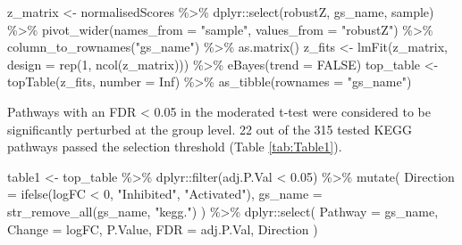 \documentclass[9pt,a4paper,]{extarticle}
\newenvironment{Shaded}{\begin{snugshade}}{\end{snugshade}}
\newcommand{\AttributeTok}[1]{\textcolor[rgb]{0.77,0.63,0.00}{#1}}
\newcommand{\ConstantTok}[1]{\textcolor[rgb]{0.00,0.00,0.00}{#1}}
\newcommand{\DecValTok}[1]{\textcolor[rgb]{0.00,0.00,0.81}{#1}}
\newcommand{\FloatTok}[1]{\textcolor[rgb]{0.00,0.00,0.81}{#1}}
\newcommand{\FunctionTok}[1]{\textcolor[rgb]{0.00,0.00,0.00}{#1}}
\newcommand{\NormalTok}[1]{#1}
\newcommand{\OtherTok}[1]{\textcolor[rgb]{0.56,0.35,0.01}{#1}}
\newcommand{\SpecialCharTok}[1]{\textcolor[rgb]{0.00,0.00,0.00}{#1}}
\newcommand{\StringTok}[1]{\textcolor[rgb]{0.31,0.60,0.02}{#1}}
\begin{document}
\begin{Shaded}
\begin{Highlighting}[]
\NormalTok{z\_matrix }\OtherTok{\textless{}{-}}\NormalTok{ normalisedScores }\SpecialCharTok{\%\textgreater{}\%}
\NormalTok{  dplyr}\SpecialCharTok{::}\FunctionTok{select}\NormalTok{(robustZ, gs\_name, sample) }\SpecialCharTok{\%\textgreater{}\%}
  \FunctionTok{pivot\_wider}\NormalTok{(}\AttributeTok{names\_from =} \StringTok{"sample"}\NormalTok{, }\AttributeTok{values\_from =} \StringTok{"robustZ"}\NormalTok{) }\SpecialCharTok{\%\textgreater{}\%}
  \FunctionTok{column\_to\_rownames}\NormalTok{(}\StringTok{"gs\_name"}\NormalTok{) }\SpecialCharTok{\%\textgreater{}\%}
  \FunctionTok{as.matrix}\NormalTok{()}
\NormalTok{z\_fits }\OtherTok{\textless{}{-}} \FunctionTok{lmFit}\NormalTok{(z\_matrix, }\AttributeTok{design =} \FunctionTok{rep}\NormalTok{(}\DecValTok{1}\NormalTok{, }\FunctionTok{ncol}\NormalTok{(z\_matrix))) }\SpecialCharTok{\%\textgreater{}\%} 
  \FunctionTok{eBayes}\NormalTok{(}\AttributeTok{trend =} \ConstantTok{FALSE}\NormalTok{)}
\NormalTok{top\_table }\OtherTok{\textless{}{-}} \FunctionTok{topTable}\NormalTok{(z\_fits, }\AttributeTok{number =} \ConstantTok{Inf}\NormalTok{) }\SpecialCharTok{\%\textgreater{}\%}
  \FunctionTok{as\_tibble}\NormalTok{(}\AttributeTok{rownames =} \StringTok{"gs\_name"}\NormalTok{)}
\end{Highlighting}
\end{Shaded}

Pathways with an FDR \textless{} 0.05 in the moderated t-test were considered to be significantly perturbed at the group level.
22 out of the 315 tested KEGG pathways passed the selection threshold (Table \ref{tab:Table1}).

\begin{Shaded}
\begin{Highlighting}[]
\NormalTok{table1 }\OtherTok{\textless{}{-}}\NormalTok{ top\_table }\SpecialCharTok{\%\textgreater{}\%}
\NormalTok{  dplyr}\SpecialCharTok{::}\FunctionTok{filter}\NormalTok{(adj.P.Val }\SpecialCharTok{\textless{}} \FloatTok{0.05}\NormalTok{) }\SpecialCharTok{\%\textgreater{}\%} 
  \FunctionTok{mutate}\NormalTok{(}
    \AttributeTok{Direction =} \FunctionTok{ifelse}\NormalTok{(logFC }\SpecialCharTok{\textless{}} \DecValTok{0}\NormalTok{, }\StringTok{"Inhibited"}\NormalTok{, }\StringTok{"Activated"}\NormalTok{), }
    \AttributeTok{gs\_name =} \FunctionTok{str\_remove\_all}\NormalTok{(gs\_name, }\StringTok{"kegg."}\NormalTok{)}
\NormalTok{  ) }\SpecialCharTok{\%\textgreater{}\%}
\NormalTok{  dplyr}\SpecialCharTok{::}\FunctionTok{select}\NormalTok{(}
    \AttributeTok{Pathway =}\NormalTok{ gs\_name, }\AttributeTok{Change =}\NormalTok{ logFC,  P.Value, }\AttributeTok{FDR =}\NormalTok{ adj.P.Val, Direction}
\NormalTok{  )}
\end{Highlighting}
\end{Shaded}
\end{document}
